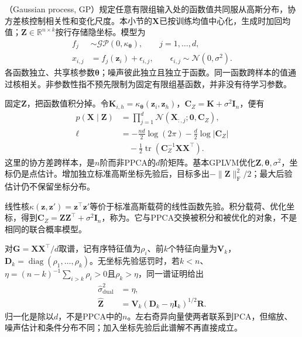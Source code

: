 （Gaussian process, GP）规定任意有限组输入处的函数值共同服从高斯分布，协方差核控制相关性和变化尺度。本小节的$\bm{X}$已按训练均值中心化，生成时加回均值；$\bm{Z}\in\mathbb{R}^{n\times k}$按行存储隐坐标。模型为
\begin{equation}
\label{eq:dim-gplvm-generative}
\begin{aligned}
f_j&\sim\mathcal{GP}(0,\kappa_{\bm{\theta}}),
\qquad j=1,\ldots,d,\\
x_{i,j}&=f_j(\bm{z}_i)+\epsilon_{i,j},
\qquad \epsilon_{i,j}\sim\mathcal{N}(0,\sigma^2).
\end{aligned}
\end{equation}
各函数独立、共享核参数$\bm{\theta}$；噪声彼此独立且独立于函数。同一函数跨样本的值通过核相关。非参数性指不预先限制为固定有限组基函数，并非没有待学习参数。

固定$\bm{Z}$，把函数值积分掉。令$\bm{K}_{i,h}=\kappa_{\bm{\theta}}(\bm{z}_i,\bm{z}_h)$，$\bm{C}_Z=\bm{K}+\sigma^2\bm{I}_n$，便有
\begin{equation}
\label{eq:dim-gplvm-likelihood}
\begin{aligned}
p(\bm{X}\mid\bm{Z})
&=\prod_{j=1}^d
\mathcal{N}(\bm{X}_{:,j};\bm{0},\bm{C}_Z),\\
\ell&=-\frac{nd}{2}\log(2\pi)
-\frac{d}{2}\log|\bm{C}_Z|\\
&\quad-\frac{1}{2}
\operatorname{tr}(\bm{C}_Z^{-1}\bm{X}\bm{X}^\top).
\end{aligned}
\end{equation}
这里的协方差跨样本，是$n$阶而非PPCA的$d$阶矩阵。基本GPLVM优化$\bm{Z},\bm{\theta},\sigma^2$，坐标仍是点估计。增加独立标准高斯坐标先验后，目标多出$-\lVert\bm{Z}\rVert_{\mathrm{F}}^2/2$；最大后验估计仍不保留坐标分布。

线性核$\kappa(\bm{z},\bm{z}')=\bm{z}^\top\bm{z}'$等价于标准高斯载荷的线性函数先验。积分载荷、优化坐标，得到$\bm{C}_Z=\bm{Z}\bm{Z}^\top+\sigma^2\bm{I}_n$，称为。它与PPCA交换被积分和被优化的对象，不是相同的联合概率模型。

对$\bm{G}=\bm{X}\bm{X}^\top/d$取谱，记有序特征值为$\rho_i$、前$k$个特征向量为$\bm{V}_k$，$\bm{D}_k=\operatorname{diag}(\rho_1,\ldots,\rho_k)$。无坐标先验惩罚时，若$k<n$、$\eta=(n-k)^{-1}\sum_{i>k}\rho_i>0$且$\rho_k>\eta$，同一谱证明给出
\begin{equation}
\label{eq:dim-gplvm-dual}
\begin{aligned}
\hat{\sigma}_{\mathrm{dual}}^2&=\eta,\\
\hat{\bm{Z}}&=\bm{V}_k(\bm{D}_k-\eta\bm{I}_k)^{1/2}\bm{R}.
\end{aligned}
\end{equation}
归一化是除以$d$，不是PPCA中的$n$。左右奇异向量使两者联系到PCA，但缩放、噪声估计和条件分布不同；加入坐标先验后此谱解不再直接成立。

